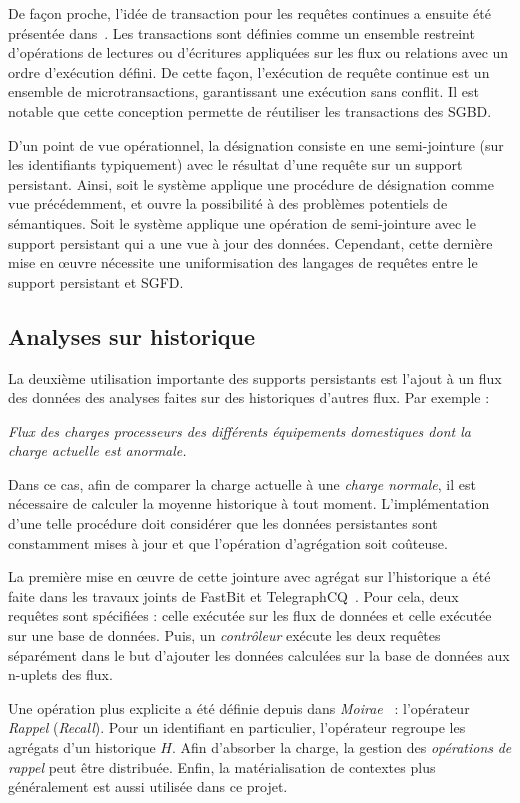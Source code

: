 De façon proche, l'idée de transaction pour les requêtes continues a ensuite été présentée dans~\cite{Botan:transaction}. Les transactions sont définies comme un ensemble restreint d'opérations de lectures ou d'écritures appliquées sur les flux ou relations avec un ordre d'exécution défini. De cette façon, l'exécution de requête continue est un ensemble de microtransactions, garantissant une exécution sans conflit. Il est notable que cette conception permette de réutiliser les transactions des SGBD.

D'un point de vue opérationnel, la désignation consiste en une semi-jointure (sur les identifiants typiquement) avec le résultat d'une requête sur un support persistant. Ainsi, soit le système applique une procédure de désignation comme vue précédemment, et ouvre la possibilité à des problèmes potentiels de sémantiques. Soit le système applique une opération de semi-jointure avec le support persistant qui a une vue à jour des données. Cependant, cette dernière mise en œuvre nécessite une uniformisation des langages de requêtes entre le support persistant et SGFD.

\subsection{Analyses sur historique}
La deuxième utilisation importante des supports persistants est l'ajout à un flux des données des analyses faites sur des historiques d'autres flux. Par exemple :
\begin{center}
\it Flux des charges processeurs des différents équipements domestiques dont la charge actuelle est anormale.
\end{center}
Dans ce cas, afin de comparer la charge actuelle à une \textit{charge normale}, il est nécessaire de calculer la moyenne historique à tout moment. L'implémentation d'une telle procédure doit considérer que les données persistantes sont constamment mises à jour et que l'opération d'agrégation soit coûteuse. 

La première mise en œuvre de cette jointure avec agrégat sur l'historique a été faite dans les travaux joints de FastBit et TelegraphCQ~\cite{Reiss:fastbit}. Pour cela, deux requêtes sont spécifiées : celle exécutée sur les flux de données et celle exécutée sur une base de données. Puis, un \textit{contrôleur} exécute les deux requêtes séparément dans le but d'ajouter les données calculées sur la base de données aux n-uplets des flux.

Une opération plus explicite a été définie depuis dans \textit{Moirae}~\cite{Balazinska:moirae} : l'opérateur \textit{Rappel} (\textit{Recall}). Pour un identifiant en particulier, l'opérateur regroupe les agrégats d'un historique $H$. Afin d'absorber la charge, la gestion des \textit{opérations} \textit{de} \textit{rappel} peut être distribuée. Enfin, la matérialisation de contextes plus généralement est aussi utilisée dans ce projet.

